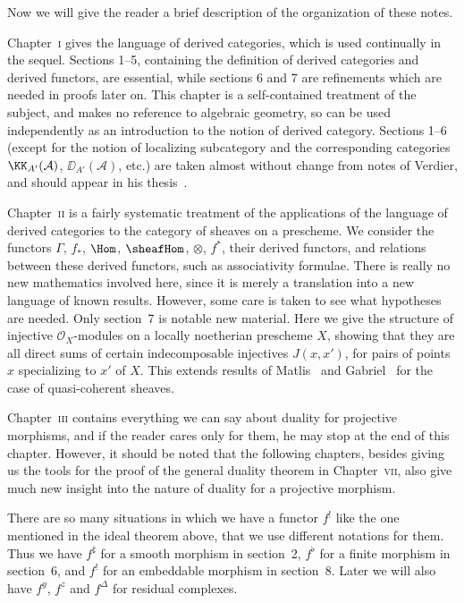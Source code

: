 \bigskip

Now we will give the reader a brief description of the organization of these notes.

Chapter~\textsc{i} gives the language of derived categories, which is used continually in the sequel. Sections 1--5, containing the definition of derived categories and derived functors, are essential, while sections 6 and 7 are refinements which are needed in proofs later on. This chapter is a self-contained treatment of the subject, and makes no reference to algebraic geometry, so can be used independently as an introduction to the notion of derived category. Sections 1--6 (except for the notion of localizing subcategory and the corresponding categories $\KK_{A'}(\mathcal{A})$, $\DD_{A'}(\mathcal{A})$, etc.) are taken almost without change from notes of Verdier, and should appear in his thesis~\cite{18}.


Chapter~\textsc{ii} is a fairly systematic treatment of the applications of the language of derived categories to the category of sheaves on a prescheme. We consider the functors $\Gamma$, $f_{*}$, $\Hom$, $\sheafHom$, $\otimes$, $f^{*}$, their derived functors, and relations between these derived functors, such as associativity formulae. There is really no new mathematics involved here, since it is merely a translation into a new language of known results. However, some care is taken to see what hypotheses are needed. Only section~7 is notable new material. Here we give the structure of injective $\mathcal{O}_{X}$-modules on a locally noetherian prescheme $X$, showing that they are all direct sums of certain indecomposable injectives $J(x,x')$, for pairs of points $x$ specializing to $x'$ of $X$. This extends results of Matlis~\cite{13} and Gabriel~\cite{5} for the case of quasi-coherent sheaves.

Chapter~\textsc{iii} contains everything we can say about duality for projective morphisms, and if the reader cares only for them, he may stop at the end of this chapter. However, it should be noted that the following chapters, besides giving us the tools for the proof of the general duality theorem in Chapter~\textsc{vii}, also give much new insight into the nature of duality for a projective morphism.

There are so many situations in which we have a functor $f^{!}$ like the one mentioned in the ideal theorem above, that we use different notations for them. Thus we have $f^{\sharp}$ for a smooth morphism in section~2, $f^{\flat}$ for a finite morphism in section~6, and $f^{!}$ for an embeddable morphism in section~8. Later we will also have $f^{y}$, $f^{z}$  and $f^{\Delta}$  for residual complexes.

